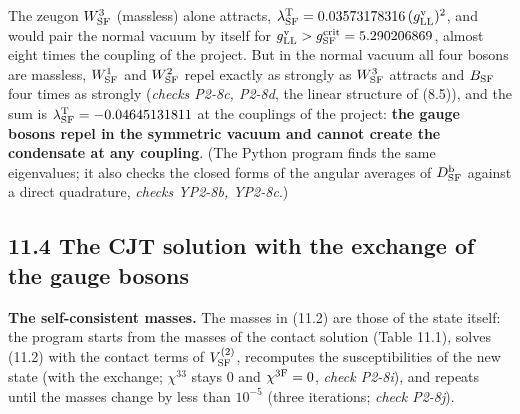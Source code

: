 \documentclass[
  10pt,
]{article}
\begin{document}
The zeugon \(W^3_{\rm SF}\) (massless) alone attracts,
\(\lambda^{\rm T}_{\rm SF}=0.03573178316\,(g^{\rm v}_{\rm LL})^2\), and
would pair the normal vacuum by itself for
\(g^{\rm v}_{\rm LL}>g^{\rm crit}_{\rm SF}=5.290206869\), almost eight
times the coupling of the project. But in the normal vacuum all four
bosons are massless, \(W^1_{\rm SF}\) and \(W^2_{\rm SF}\) repel exactly
as strongly as \(W^3_{\rm SF}\) attracts and \(B_{\rm SF}\) four times
as strongly (\emph{checks P2-8c, P2-8d}, the linear structure of (8.5)),
and the sum is \(\lambda^{\rm T}_{\rm SF}=-0.04645131811\) at the
couplings of the project: \textbf{the gauge bosons repel in the
symmetric vacuum and cannot create the condensate at any coupling}. (The
Python program finds the same eigenvalues; it also checks the closed
forms of the angular averages of \(D^{\rm b}_{\rm SF}\) against a direct
quadrature, \emph{checks YP2-8b, YP2-8c}.)

\hypertarget{the-cjt-solution-with-the-exchange-of-the-gauge-bosons}{%
\subsection{11.4 The CJT solution with the exchange of the gauge
bosons}\label{the-cjt-solution-with-the-exchange-of-the-gauge-bosons}}

\textbf{The self-consistent masses.} The masses in (11.2) are those of
the state itself: the program starts from the masses of the contact
solution (Table 11.1), solves (11.2) with the contact terms of
\(V^{(2)}_{\rm SF}\), recomputes the susceptibilities of the new state
(with the exchange; \(\chi^{33}\) stays 0 and \(\chi^{3{\rm F}}=0\),
\emph{check P2-8i}), and repeats until the masses change by less than
\(10^{-5}\) (three iterations; \emph{check P2-8j}).
\end{document}
